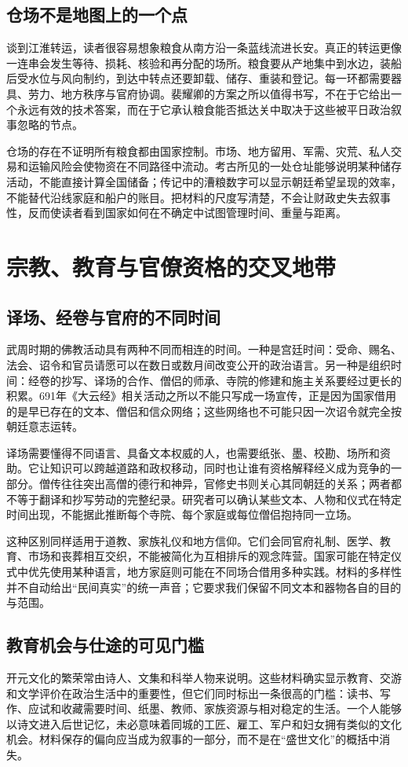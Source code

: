 \subsection{仓场不是地图上的一个点}
谈到江淮转运，读者很容易想象粮食从南方沿一条蓝线流进长安。真正的转运更像一连串会发生等待、损耗、核验和再分配的场所。粮食要从产地集中到水边，装船后受水位与风向制约，到达中转点还要卸载、储存、重装和登记。每一环都需要器具、劳力、地方秩序与官府协调。裴耀卿的方案之所以值得书写，不在于它给出一个永远有效的技术答案，而在于它承认粮食能否抵达关中取决于这些被平日政治叙事忽略的节点。

仓场的存在不证明所有粮食都由国家控制。市场、地方留用、军需、灾荒、私人交易和运输风险会使物资在不同路径中流动。考古所见的一处仓址能够说明某种储存活动，不能直接计算全国储备；传记中的漕粮数字可以显示朝廷希望呈现的效率，不能替代沿线家庭和船户的账目。把材料的尺度写清楚，不会让财政史失去叙事性，反而使读者看到国家如何在不确定中试图管理时间、重量与距离。

\section{宗教、教育与官僚资格的交叉地带}
\subsection{译场、经卷与官府的不同时间}
武周时期的佛教活动具有两种不同而相连的时间。一种是宫廷时间：受命、赐名、法会、诏令和官员请愿可以在数日或数月间改变公开的政治语言。另一种是组织时间：经卷的抄写、译场的合作、僧侣的师承、寺院的修建和施主关系要经过更长的积累。691年《大云经》相关活动之所以不能只写成一场宣传，正是因为国家借用的是早已存在的文本、僧侣和信众网络；这些网络也不可能只因一次诏令就完全按朝廷意志运转。

译场需要懂得不同语言、具备文本权威的人，也需要纸张、墨、校勘、场所和资助。它让知识可以跨越道路和政权移动，同时也让谁有资格解释经义成为竞争的一部分。僧传往往突出高僧的德行和神异，官修史书则关心其同朝廷的关系；两者都不等于翻译和抄写劳动的完整纪录。研究者可以确认某些文本、人物和仪式在特定时间出现，不能据此推断每个寺院、每个家庭或每位僧侣抱持同一立场。

这种区别同样适用于道教、家族礼仪和地方信仰。它们会同官府礼制、医学、教育、市场和丧葬相互交织，不能被简化为互相排斥的观念阵营。国家可能在特定仪式中优先使用某种语言，地方家庭则可能在不同场合借用多种实践。材料的多样性并不自动给出“民间真实”的统一声音；它要求我们保留不同文本和器物各自的目的与范围。

\subsection{教育机会与仕途的可见门槛}
开元文化的繁荣常由诗人、文集和科举人物来说明。这些材料确实显示教育、交游和文学评价在政治生活中的重要性，但它们同时标出一条很高的门槛：读书、写作、应试和收藏需要时间、纸墨、教师、家族资源与相对稳定的生活。一个人能够以诗文进入后世记忆，未必意味着同城的工匠、雇工、军户和妇女拥有类似的文化机会。材料保存的偏向应当成为叙事的一部分，而不是在“盛世文化”的概括中消失。

